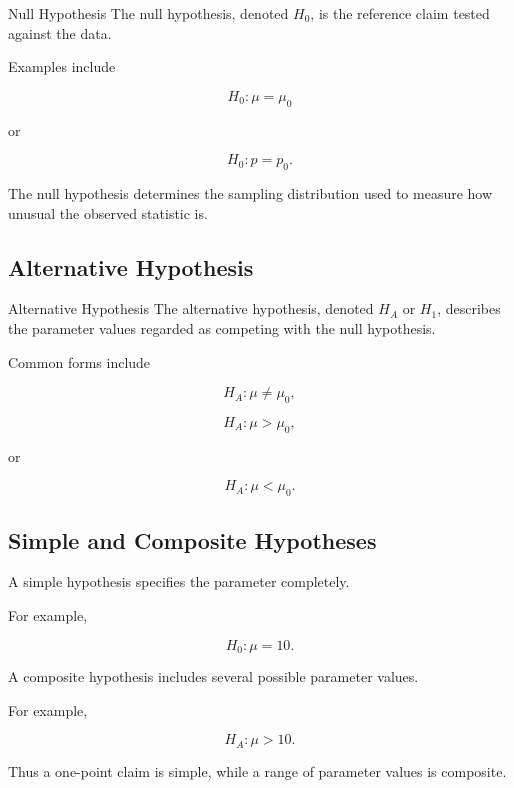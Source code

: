 \begin{definitionbox}{Null Hypothesis}
The null hypothesis, denoted \(H_0\), is the reference claim tested
against the data.
\end{definitionbox}

Examples include

\[
\boxed{
H_0:\mu=\mu_0
}
\]

or

\[
\boxed{
H_0:p=p_0.
}
\]

The null hypothesis determines the sampling distribution used to measure
how unusual the observed statistic is.

\subsection{Alternative Hypothesis}
\label{subsec:alternative-hypothesis}

\begin{definitionbox}{Alternative Hypothesis}
The alternative hypothesis, denoted \(H_A\) or \(H_1\), describes the
parameter values regarded as competing with the null hypothesis.
\end{definitionbox}

Common forms include

\[
\boxed{
H_A:\mu\neq\mu_0,
}
\]

\[
\boxed{
H_A:\mu>\mu_0,
}
\]

or

\[
\boxed{
H_A:\mu<\mu_0.
}
\]

\subsection{Simple and Composite Hypotheses}
\label{subsec:simple-composite-hypotheses}

A simple hypothesis specifies the parameter completely.

For example,

\[
\boxed{
H_0:\mu=10.
}
\]

A composite hypothesis includes several possible parameter values.

For example,

\[
\boxed{
H_A:\mu>10.
}
\]

Thus a one-point claim is simple, while a range of parameter values is
composite.

